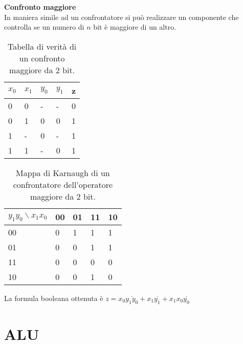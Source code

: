 \begin{defn}
	\textbf{Confronto maggiore} \\

	In maniera simile ad un confrontatore si può realizzare un componente che
	controlla se un numero di $ n $ bit è maggiore di un altro.
	
	\begin{table}[H]
		\centering
		\caption{Tabella di verità di un confronto maggiore da 2 bit.}
		\label{tab:2bitgreater}
		\begin{tabular}{|ll|ll|l|}
			\hline
			$ x_0 $ & $ x_1 $ & $ y_0 $ & $ y_1 $ & z \\ \hline
			0       & 0       & -       & -       & 0 \\
			0       & 1       & 0       & 0       & 1 \\
			1       & -       & 0       & -       & 1 \\
			1       & 1       & -       & 0       & 1 \\ \hline
		\end{tabular}
	\end{table}
	
	\begin{table}[H]
		\centering
		\caption{Mappa di Karnaugh di un confrontatore dell'operatore maggiore da 2 bit.}
		\label{tab:2bitgreater}
		\begin{tabular}{|l|llll|}
			\hline
			$ y_1y_0 \backslash x_1x_0 $ & 00 & 01 & 11                        &
			10                        \\ \hline
			00                         & 0  & 1  & \cellcolor[HTML]{FFCCC9}1 &
			\cellcolor[HTML]{FFCCC9}1 \\
			01                         & 0  & 0  & \cellcolor[HTML]{FFCCC9}1 &
			\cellcolor[HTML]{FFCCC9}1 \\
			11                         & 0  & 0  & 0                         & 0
			\\
			10                         & 0  & 0  & 1                         & 0
			\\ \hline
		\end{tabular}
	\end{table}
	
	La formula booleana ottenuta è $ z = x_0\overbar{y_1y_0} + x_1\overbar{y_1}
	+ x_1x_0\overbar{y_0} $
\end{defn}

\section{ALU}

